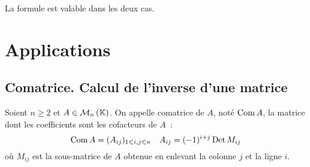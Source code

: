 La formule est valable dans les deux cas.

\section{Applications}

\subsection{Comatrice. Calcul de l'inverse d'une matrice}

\begin{defdef}
  Soient \(n \geqslant 2\) et \(A \in \mathcal{M}_{n}\left(\mathbb{K}\right)\). On appelle comatrice
  de \(A\), noté \(\operatorname{Com} A\), la matrice dont les coefficients sont les
  cofacteurs de \(A\)~:
  \begin{equation}
    \operatorname{Com} A = (A_{ij})_{1 \leqslant i,j \leqslant n} \quad
    A_{ij}=(-1)^{i+j} \operatorname{Det} M_{ij}
  \end{equation}
  où \(M_{ij}\) est la sous-matrice de \(A\) obtenue en enlevant la
  colonne \(j\) et la ligne \(i\).
\end{defdef}

